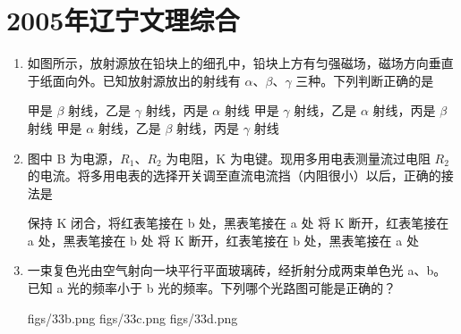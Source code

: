 \documentclass[\gkver]{gaokaozhenti}
\begin{document}
\chapter{2005年辽宁文理综合}

\begin{enumerate}
\item
如图所示，放射源放在铅块上的细孔中，铅块上方有匀强磁场，磁场方向垂直于纸面向外。已知放射源放出的射线有 $\alpha$、$\beta$、$\gamma$ 三种。下列判断正确的是


{甲是 $\beta$ 射线，乙是 $\gamma$ 射线，丙是 $\alpha$ 射线}
{甲是 $\gamma$ 射线，乙是 $\alpha$ 射线，丙是 $\beta$ 射线}
{甲是 $\alpha$ 射线，乙是 $\beta$ 射线，丙是 $\gamma$ 射线}


\item
图中 B 为电源，$R_{1}$、$R_{2}$ 为电阻，K 为电键。现用多用电表测量流过电阻 $R_{2}$ 的电流。将多用电表的选择开关调至直流电流挡（内阻很小）以后，正确的接法是


{保持 K 闭合，将红表笔接在 b 处，黑表笔接在 a 处}
{将 K 断开，红表笔接在 a 处，黑表笔接在 b 处}
{将 K 断开，红表笔接在 b 处，黑表笔接在 a 处}


\item
一束复色光由空气射向一块平行平面玻璃砖，经折射分成两束单色光 a、b。已知 a 光的频率小于 b 光的频率。下列哪个光路图可能是正确的？

{figs/33b.png}
{figs/33c.png}
{figs/33d.png}


\end{enumerate}
\end{document}
